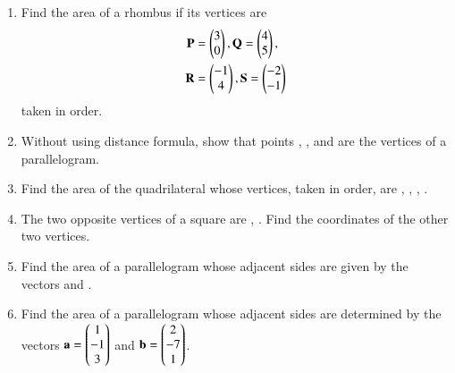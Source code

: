 \begin{enumerate}[label=\arabic*.,ref=\thesubsection.\theenumi]
\item Find the area of a rhombus if its vertices are 
\begin{align}
\mathbf{P} &= \begin{pmatrix}3\\0\end{pmatrix}, \mathbf{Q} =\begin{pmatrix}4\\5\end{pmatrix},
\\
\mathbf{R} &= \begin{pmatrix}-1\\4\end{pmatrix}, \mathbf{S} = \begin{pmatrix}-2\\-1\end{pmatrix} 
\end{align}
taken in order.
\\
\solution

\item Without using distance formula, show that points , ,  and  are the vertices of a parallelogram.
\\
\solution

\item  Find the area of the quadrilateral whose vertices, taken in order, are 
 ,  ,  ,  . 
\\
\solution

\item The two opposite vertices of a square are ,  . Find the coordinates of the other two vertices.
\\
\solution

\item Find the area of a parallelogram whose adjacent sides are given by the vectors  and .
\\
\solution

\item Find the area of a parallelogram whose adjacent sides are determined by the vectors $\mathbf{a} = \begin{pmatrix}1\\-1\\3\end{pmatrix}$ and $\mathbf{b}=\begin{pmatrix}2\\-7\\1\end{pmatrix}$.

\end{enumerate}
